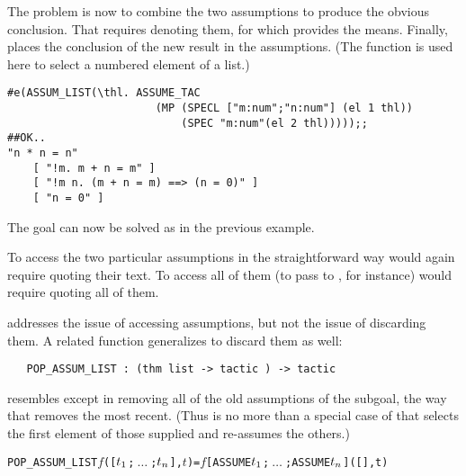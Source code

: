 \noindent The problem is now to combine the two assumptions to produce the
obvious conclusion. That requires denoting
 them, for which 
provides the means. Finally,
 places the conclusion of the new result in the assumptions.
(The \ML{} function  is used here to select a
numbered element of a list.)

\begin{session}\begin{verbatim}
#e(ASSUM_LIST(\thl. ASSUME_TAC
                       (MP (SPECL ["m:num";"n:num"] (el 1 thl))
                           (SPEC "m:num"(el 2 thl)))));;
##OK..
"n * n = n"
    [ "!m. m + n = m" ]
    [ "!m n. (m + n = m) ==> (n = 0)" ]
    [ "n = 0" ]
\end{verbatim}\end{session}

\noindent The goal can now be solved as in the previous example.

To access the
two particular assumptions in the straightforward way would again require quoting
their text. To access all of them (to pass to , for
instance) would require quoting all of them.

 addresses the issue of accessing assumptions,
but not the issue of discarding them.  A related function generalizes
 to discard them as well:

\begin{hol}\begin{verbatim}
   POP_ASSUM_LIST : (thm list -> tactic ) -> tactic
\end{verbatim}\end{hol}

\noindent {}
resembles  except in removing
all of the old assumptions of the subgoal, the way that 
removes the most recent.  (Thus  is no more than a special case
of  that selects the first element of those supplied
and re-assumes the others.)

\begin{hol}\begin{alltt}
   POP_ASSUM_LIST \(f\) ([\(t\sb{1}\);\(\ \ldots\ \);\(t\sb{n}\)],\(t\)) =  \(f\) [ASSUME \(t\sb{1}\);\(\ \ldots\ \);ASSUME \(t\sb{n}\)] ([],t)
\end{alltt}\end{hol}

